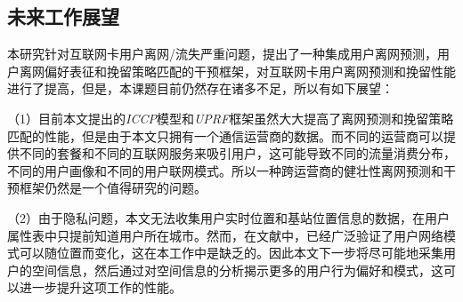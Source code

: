 %
%

\par


\subsection{未来工作展望}
本研究针对互联网卡用户离网/流失严重问题，提出了一种集成用户离网预测，用户离网偏好表征和挽留策略匹配的干预框架，对互联网卡用户离网预测和挽留性能进行了提高，但是，本课题目前仍然存在诸多不足，所以有如下展望：

（1）目前本文提出的\emph{ICCP}模型和\emph{UPRF}框架虽然大大提高了离网预测和挽留策略匹配的性能，但是由于本文只拥有一个通信运营商的数据。而不同的运营商可以提供不同的套餐和不同的互联网服务来吸引用户，这可能导致不同的流量消费分布，不同的用户画像和不同的用户联网模式。所以一种跨运营商的健壮性离网预测和干预框架仍然是一个值得研究的问题。

（2）由于隐私问题，本文无法收集用户实时位置和基站位置信息的数据，在用户属性表中只提前知道用户所在城市。然而，在文献中，已经广泛验证了用户网络模式可以随位置而变化，这在本工作中是缺乏的。因此本文下一步将尽可能地采集用户的空间信息，然后通过对空间信息的分析揭示更多的用户行为偏好和模式，这可以进一步提升这项工作的性能。

